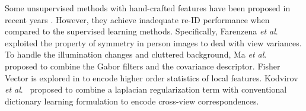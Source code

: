 \documentclass[journal]{IEEEtran}
\newcommand{\etal}{\textit{et al}.}
\begin{document}
 Some unsupervised methods with hand-crafted features have been proposed in recent years \cite{farenzena2010person,khan2016unsupervised,kodirov2016person,kodirov2015dictionary,lisanti2015person,liu2017stepwise,ma2017person,wang2014unsupervised,wang2016towards,ye2019dynamic,zhao2017person,yao2019deep}. However, they achieve inadequate re-ID performance when compared to the supervised learning methods. Specifically, Farenzena \etal\ \cite{farenzena2010person} exploited the property of symmetry in person images to deal with view variances. To handle the illumination changes and cluttered background, Ma \etal\ \cite{ma2012bicov} proposed to combine the Gabor filters and the covariance descriptor. Fisher Vector is explored in \cite{ma2012local} to encode higher order statistics of local features. Kodvirov \etal\ \cite{kodirov2015dictionary} proposed to combine a laplacian regularization term with conventional dictionary learning formulation to encode cross-view correspondences.
 
\end{document}
